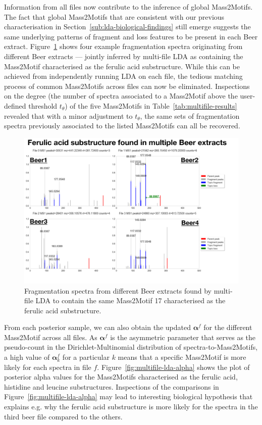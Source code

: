 Information from all files now contribute to the inference of global Mass2Motifs. The fact that global Mass2Motifs that are consistent with our previous characterisation in Section~\ref{sub:lda-biological-findings} still emerge suggests the same underlying patterns of fragment and loss features to be present in each Beer extract. Figure~\ref{fig:multifile-lda} shows four example fragmentation spectra originating from different Beer extracts --- jointly inferred by multi-file LDA as containing the Mass2Motif characterised as the ferulic acid substructure. While this can be achieved from independently running LDA on each file, the tedious matching process of common Mass2Motifs across files can now be eliminated. Inspections on the degree (the number of spectra associated to a Mass2Motif above the user-defined threshold $t_{\theta}$) of the five Mass2Motifs in Table~\ref{tab:multifile-results} revealed that with a minor adjustment to $t_{\theta}$, the same sets of fragmentation spectra previously associated to the listed Mass2Motifs can all be recovered. 

\begin{figure}[!htbp]
\centering\includegraphics[width=1.0\linewidth]{07-lda/figures/multifile.pdf}
\centering\caption{Fragmentation spectra from different Beer extracts found by multi-file LDA to contain the same Mass2Motif 17 characterised as the ferulic acid substructure.\label{fig:multifile-lda}}
\end{figure}

From each posterior sample, we can also obtain the updated $\boldsymbol{\alpha}^f$ for the different Mass2Motif across all files. As $\boldsymbol{\alpha}^f$ is the asymmetric parameter that serves as the pseudo-count in the Dirichlet-Multinomial distribution of spectra-to-Mass2Motifs, a high value of $\boldsymbol{\alpha}^f_k$ for a particular $k$ means that a specific Mass2Motif is more likely for each spectra in file $f$. Figure~\ref{fig:multifile-lda-alpha} shows the plot of posterior alpha values for the Mass2Motifs characterised as the ferulic acid, histidine and leucine substructures. Inspections of the comparisons in Figure~\ref{fig:multifile-lda-alpha} may lead to interesting biological hypothesis that explains e.g. why the ferulic acid substructure is more likely for the spectra in the third beer file compared to the others.

